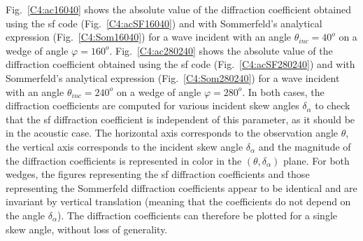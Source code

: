 Fig.~\ref{C4:ac16040} shows the absolute value of the diffraction coefficient obtained using the \acrshort{sf} code (Fig.~\ref{C4:acSF16040}) and with Sommerfeld's analytical expression (Fig.~\ref{C4:Som16040}) for a wave incident with an angle $\theta_{inc}=40^o$ on a wedge of angle $\varphi=160^o$. Fig.~\ref{C4:ac280240} shows the absolute value of the diffraction coefficient obtained using the \acrshort{sf} code (Fig.~\ref{C4:acSF280240}) and with Sommerfeld's analytical expression (Fig.~\ref{C4:Som280240}) for a wave incident with an angle $\theta_{inc}=240^o$ on a wedge of angle $\varphi=280^o$. In both cases, the diffraction coefficients are computed for various incident skew angles $\delta_{\alpha}$ to check that the \acrshort{sf} diffraction coefficient is independent of this parameter, as it should be in the acoustic case. The horizontal axis corresponds to the observation angle $\theta$, the vertical axis corresponds to the incident skew angle $\delta_{\alpha}$ and the magnitude of the diffraction coefficients is represented in color in the $(\theta,\delta_{\alpha})$ plane. For both wedges, the figures representing the \acrshort{sf} diffraction coefficients and those representing the Sommerfeld diffraction coefficients appear to be identical and are invariant by vertical translation (meaning that the coefficients do not depend on the angle $\delta_{\alpha}$). The diffraction coefficients can therefore be plotted for a single skew angle, without loss of generality. 

